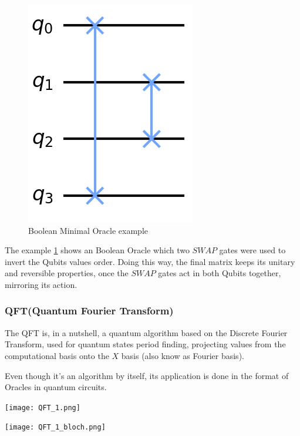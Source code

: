 \documentclass{article}
\begin{document}
\begin{figure}[!ht]
	\centering
	\includegraphics[scale=0.3]{minimal-oracle.png}
	\caption{Boolean Minimal Oracle example}
	\label{fig:minimal-oracle}
\end{figure}

The example \ref{fig:minimal-oracle} shows an Boolean Oracle which two $SWAP$ gates were used to invert the Qubits values order. Doing this way, the final matrix keeps its unitary and reversible properties, once the  $SWAP$ gates act in both Qubits together, mirroring its action.


\subsubsection{QFT(Quantum Fourier Transform)}
The QFT is, in a nutshell, a quantum algorithm based on the Discrete Fourier Transform, used for quantum states period finding, projecting values from the computational basis onto the $X$ basis (also know as Fourier basis).

Even though it's an algorithm by itself, its application is done in the format of Oracles in quantum circuits.

\begin{center}
	\texttt{[image: QFT\_1.png]}
	\label{fig:QFT}
\end{center}

\begin{center}
	\texttt{[image: QFT\_1\_bloch.png]}
	\label{fig:QFT-bloch}
\end{center}
\end{document}

